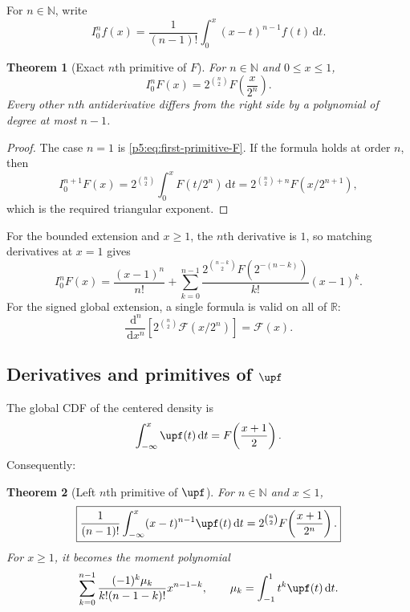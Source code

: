 \documentclass[11pt,oneside]{article}
\newtheorem{theorem}{Theorem}[section]
\theoremstyle{definition}
\theoremstyle{remark}
\newcommand{\R}{\mathbb R}
\newcommand{\N}{\mathbb N}
\newcommand{\dd}{\,\mathrm d}
\newcommand{\1}{\mathbf 1}
\begin{document}
For $n\in\N$, write
\begin{equation}\label{p5:eq:In-definition}
 I_0^nf(x)=\frac1{(n-1)!}\int_0^x(x-t)^{n-1}f(t)\dd t.
\end{equation}

\begin{theorem}[Exact $n$th primitive of $F$]\label{p5:thm:nth-primitive-F}
For $n\in\N$ and $0\le x\le1$,
\begin{equation}\label{p5:eq:nth-primitive-F}
\boxed{
 I_0^nF(x)=2^{\binom n2}F\!\left(\frac{x}{2^n}\right).}
\end{equation}
Every other $n$th antiderivative differs from the right side by a polynomial of degree at most $n-1$.
\end{theorem}

\begin{proof}
The case $n=1$ is \eqref{p5:eq:first-primitive-F}.  If the formula holds at order $n$, then
\[
 I_0^{n+1}F(x)=2^{\binom n2}\int_0^xF(t/2^n)\dd t
 =2^{\binom n2+n}F(x/2^{n+1}),
\]
which is the required triangular exponent.
\end{proof}

For the bounded extension and $x\ge1$, the $n$th derivative is $1$, so matching derivatives at $x=1$ gives
\begin{equation}\label{p5:eq:nth-primitive-F-tail}
 I_0^nF(x)=\frac{(x-1)^n}{n!}
 +\sum_{k=0}^{n-1}
 \frac{2^{\binom{n-k}{2}}F(2^{-(n-k)})}{k!}(x-1)^k.
\end{equation}
For the signed global extension, a single formula is valid on all of $\R$:
\begin{equation}\label{p5:eq:signed-nth-antiderivative}
 \frac{\dd^n}{\dd x^n}
 \left[2^{\binom n2}\mathcal F(x/2^n)\right]
 =\mathcal F(x).
\end{equation}

\subsection{Derivatives and primitives of $\upf$}

The global CDF of the centered density is
\begin{equation}\label{p5:eq:up-first-primitive}
 \int_{-\infty}^{x}\upf(t)\dd t
 =F\!\left(\frac{x+1}{2}\right).
\end{equation}
Consequently:

\begin{theorem}[Left $n$th primitive of $\upf$]\label{p5:thm:nth-primitive-up}
For $n\in\N$ and $x\le1$,
\begin{equation}\label{p5:eq:nth-primitive-up}
\boxed{
 \frac1{(n-1)!}\int_{-\infty}^{x}(x-t)^{n-1}\upf(t)\dd t
 =2^{\binom n2}F\!\left(\frac{x+1}{2^n}\right).}
\end{equation}
For $x\ge1$, it becomes the moment polynomial
\begin{equation}\label{p5:eq:nth-primitive-up-tail}
 \sum_{k=0}^{n-1}
 \frac{(-1)^k\mu_k}{k!(n-1-k)!}x^{n-1-k},
 \qquad
 \mu_k=\int_{-1}^{1}t^k\upf(t)\dd t.
\end{equation}
\end{theorem}
\end{document}
